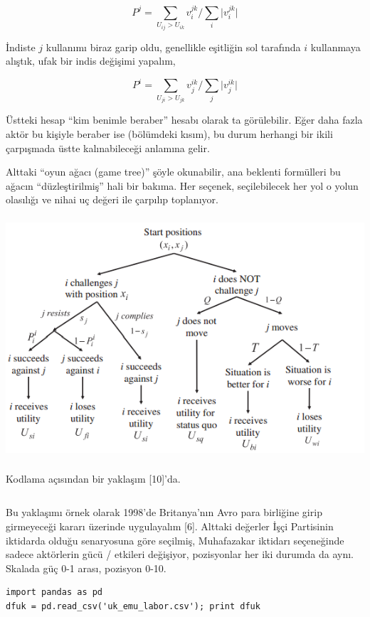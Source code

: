 \documentclass[12pt,fleqn]{article}\usepackage{../../common}
\begin{document}
$$
P^j = 
\sum_{ U_{ij} > U_{ik} } v_i^{jk} \bigg/ 
\sum_i \big| v_i^{jk} \big|
$$

İndiste $j$ kullanımı biraz garip oldu, genellikle eşitliğin sol tarafında
$i$ kullanmaya alıştık, ufak bir indis değişimi yapalım,

$$
P^i = 
\sum_{ U_{ji} > U_{jk} } v_j^{ik} \bigg/ 
\sum_j \big| v_j^{ik} \big|
$$

Üstteki hesap ``kim benimle beraber'' hesabı olarak ta görülebilir. Eğer daha
fazla aktör bu kişiyle beraber ise (bölümdeki kısım), bu durum herhangi bir
ikili çarpışmada üstte kalınabileceği anlamına gelir. 

Alttaki ``oyun ağacı (game tree)'' şöyle okunabilir, ana beklenti formülleri bu
ağacın ``düzleştirilmiş'' hali bir bakıma. Her seçenek, seçilebilecek her yol o
yolun olasılığı ve nihai uç değeri ile çarpılıp toplanıyor.

\includegraphics[height=9cm]{gametree.png}

Kodlama açısından bir yaklaşım [10]'da.

\inputminted[fontsize=\footnotesize]{python}{bdm.py}

Bu yaklaşımı örnek olarak 1998'de Britanya'nın Avro para birliğine girip
girmeyeceği kararı üzerinde uygulayalım [6]. Alttaki değerler İşçi Partisinin
iktidarda olduğu senaryosuna göre seçilmiş, Muhafazakar iktidarı seçeneğinde
sadece aktörlerin gücü / etkileri değişiyor, pozisyonlar her iki durumda da
aynı. Skalada güç 0-1 arası, pozisyon 0-10.

\begin{verbatim}
import pandas as pd
dfuk = pd.read_csv('uk_emu_labor.csv'); print dfuk
\end{verbatim}
\end{document}
